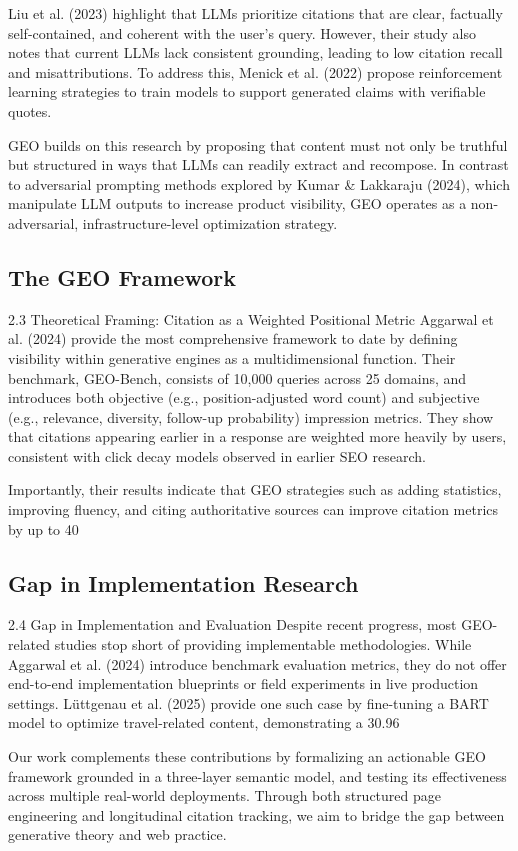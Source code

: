 Liu et al. (2023) highlight that LLMs prioritize citations that are clear, factually self-contained, and coherent with the user’s query. However, their study also notes that current LLMs lack consistent grounding, leading to low citation recall and misattributions. To address this, Menick et al. (2022) propose reinforcement learning strategies to train models to support generated claims with verifiable quotes.

GEO builds on this research by proposing that content must not only be truthful but structured in ways that LLMs can readily extract and recompose. In contrast to adversarial prompting methods explored by Kumar & Lakkaraju (2024), which manipulate LLM outputs to increase product visibility, GEO operates as a non-adversarial, infrastructure-level optimization strategy.
\subsection{The GEO Framework}

2.3 Theoretical Framing: Citation as a Weighted Positional Metric
Aggarwal et al. (2024) provide the most comprehensive framework to date by defining visibility within generative engines as a multidimensional function. Their benchmark, GEO-Bench, consists of 10,000 queries across 25 domains, and introduces both objective (e.g., position-adjusted word count) and subjective (e.g., relevance, diversity, follow-up probability) impression metrics. They show that citations appearing earlier in a response are weighted more heavily by users, consistent with click decay models observed in earlier SEO research.

Importantly, their results indicate that GEO strategies such as adding statistics, improving fluency, and citing authoritative sources can improve citation metrics by up to 40%
\subsection{Gap in Implementation Research}

2.4 Gap in Implementation and Evaluation
Despite recent progress, most GEO-related studies stop short of providing implementable methodologies. While Aggarwal et al. (2024) introduce benchmark evaluation metrics, they do not offer end-to-end implementation blueprints or field experiments in live production settings. Lüttgenau et al. (2025) provide one such case by fine-tuning a BART model to optimize travel-related content, demonstrating a 30.96%

Our work complements these contributions by formalizing an actionable GEO framework grounded in a three-layer semantic model, and testing its effectiveness across multiple real-world deployments. Through both structured page engineering and longitudinal citation tracking, we aim to bridge the gap between generative theory and web practice.

